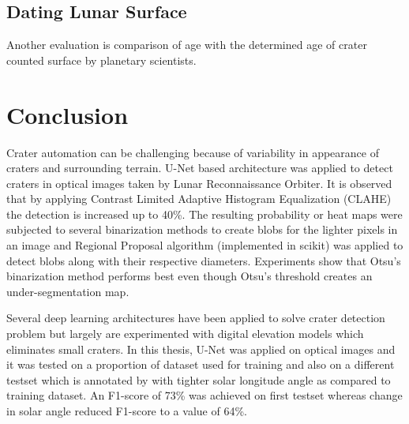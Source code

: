 \documentclass[11pt]{article}
\begin{document}
\subsection{Dating Lunar Surface}
Another evaluation is comparison of age with the determined age of crater counted surface by planetary scientists.

\section{Conclusion}
Crater automation can be challenging because of variability in appearance of craters and surrounding terrain. U-Net based architecture was applied to detect craters in optical images taken by Lunar Reconnaissance Orbiter. It is observed that by applying Contrast Limited Adaptive Histogram Equalization (CLAHE) the detection is increased up to 40\%. The resulting probability or heat maps were subjected to several binarization methods to create blobs for the lighter pixels in an image and Regional Proposal algorithm (implemented in scikit) was applied to detect blobs along with their respective diameters. Experiments show that Otsu's binarization method performs best even though Otsu's threshold creates an under-segmentation map. 

Several deep learning architectures have been applied to solve crater detection problem but largely are experimented with digital elevation models which eliminates small craters. In this thesis, U-Net was applied on optical images and it was tested on a proportion of dataset used for training and also on a different testset which is annotated by \cite{dino2020} with tighter solar longitude angle as compared to training dataset. An F1-score of 73\% was achieved on first testset whereas change in solar angle reduced F1-score to a value of 64\%.

\newpage
\clearpage




	


\end{document}
